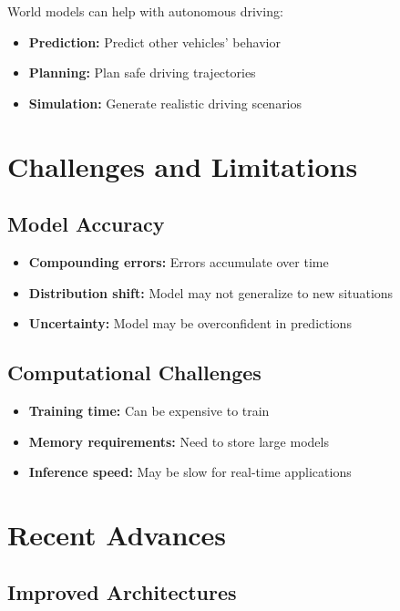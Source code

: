 World models can help with autonomous driving:
\begin{itemize}
    \item \textbf{Prediction:} Predict other vehicles' behavior
    \item \textbf{Planning:} Plan safe driving trajectories
    \item \textbf{Simulation:} Generate realistic driving scenarios
\end{itemize}

\section{Challenges and Limitations}

\subsection{Model Accuracy}

\begin{itemize}
    \item \textbf{Compounding errors:} Errors accumulate over time
    \item \textbf{Distribution shift:} Model may not generalize to new situations
    \item \textbf{Uncertainty:} Model may be overconfident in predictions
\end{itemize}

\subsection{Computational Challenges}

\begin{itemize}
    \item \textbf{Training time:} Can be expensive to train
    \item \textbf{Memory requirements:} Need to store large models
    \item \textbf{Inference speed:} May be slow for real-time applications
\end{itemize}

\section{Recent Advances}

\subsection{Improved Architectures}

